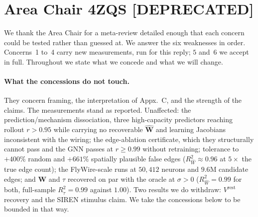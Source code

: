 \documentclass[11pt]{article}
\newcommand{\Rw}{R^2_{\widehat W}}
\newcommand{\Rt}{R^2_{\hat\tau}}
\newcommand{\Mat}[1]{\mathbf{#1}}
\begin{document}
\newpage
\section*{Area Chair 4ZQS [DEPRECATED] }
We thank the Area Chair for a meta-review detailed enough that each concern could
be tested rather than guessed at. We answer the six weaknesses in order.
Concerns~1 to~4 carry new measurements, run for this reply; $5$ and~$6$ we accept
in full. Throughout we state what we concede and what we will change.

\paragraph{What the concessions do not touch.}
They concern framing, the interpretation of Appx.~C, and the strength of the
claims. The measurements stand as reported. Unaffected: the
prediction/mechanism dissociation, three high-capacity predictors reaching
rollout $r > 0.95$ while carrying no recoverable $\widehat{\Mat{W}}$ and learning
Jacobians inconsistent with the wiring; the edge-ablation certificate, which they
structurally cannot pass and the GNN passes at $r \geq 0.99$ without retraining;
tolerance to $+400\%$ random and $+661\%$ spatially plausible false edges
($\Rw \approx 0.96$ at $5\times$ the true edge count); the FlyWire-scale runs at
$50{,}412$ neurons and $9.6$M candidate edges; and $\Mat{W}$ and $\tau$ recovered
on par with the oracle at $\sigma > 0$ ($\Rw = 0.99$ for both, full-sample
$\Rt = 0.99$ against $1.00$). Two results we do withdraw: $V^{\mathrm{rest}}$
recovery and the SIREN stimulus claim. We take the concessions below to be
bounded in that way.
\end{document}
